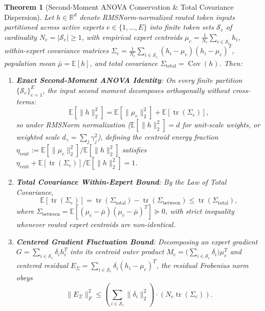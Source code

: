 \documentclass[10pt,twocolumn,letterpaper]{article}
\newtheorem{theorem}{Theorem}
\begin{document}
\begin{theorem}[Second-Moment ANOVA Conservation \& Total Covariance Dispersion]
\label{thm:anova_concentration}
Let $h \in \mathbb{R}^d$ denote RMSNorm-normalized routed token inputs partitioned across active experts $e \in \{1,\dots,E\}$ into finite token sets $\mathcal{S}_e$ of cardinality $N_e = |\mathcal{S}_e| \ge 1$, with empirical expert centroids $\mu_e = \frac{1}{N_e} \sum_{i \in \mathcal{S}_e} h_i$, within-expert covariance matrices $\Sigma_e = \frac{1}{N_e} \sum_{i \in \mathcal{S}_e} (h_i - \mu_e)(h_i - \mu_e)^T$, population mean $\bar{\mu} = \mathbb{E}[h]$, and total covariance $\Sigma_{\text{total}} = \operatorname{Cov}(h)$. Then:
\begin{enumerate}
    \item \textbf{Exact Second-Moment ANOVA Identity}: On every finite partition $\{\mathcal{S}_e\}_{e=1}^E$, the input second moment decomposes orthogonally without cross-terms:
    \begin{equation}
        \mathbb{E}\!\left[\|h\|_2^2\right] = \mathbb{E}\!\left[\|\mu_e\|_2^2\right] + \mathbb{E}\!\left[\operatorname{tr}(\Sigma_e)\right],
    \end{equation}
    so under RMSNorm normalization ($\mathbb{E}[\|h\|_2^2] = d$ for unit-scale weights, or weighted scale $d_\gamma = \sum_j \gamma_j^2$), defining the centroid energy fraction $\eta_{\text{cent}} := \mathbb{E}[\|\mu_e\|_2^2] / \mathbb{E}[\|h\|_2^2]$ satisfies $\eta_{\text{cent}} + \mathbb{E}[\operatorname{tr}(\Sigma_e)] / \mathbb{E}[\|h\|_2^2] = 1$.
    \item \textbf{Total Covariance Within-Expert Bound}: By the Law of Total Covariance,
    \begin{equation}
        \mathbb{E}\!\left[\operatorname{tr}(\Sigma_e)\right] = \operatorname{tr}(\Sigma_{\text{total}}) - \operatorname{tr}(\Sigma_{\text{between}}) \le \operatorname{tr}(\Sigma_{\text{total}}),
    \end{equation}
    where $\Sigma_{\text{between}} = \mathbb{E}[(\mu_e - \bar{\mu})(\mu_e - \bar{\mu})^T] \succeq 0$, with strict inequality whenever routed expert centroids are non-identical.
    \item \textbf{Centered Gradient Fluctuation Bound}: Decomposing an expert gradient $G = \sum_{i \in \mathcal{S}_e} \delta_i h_i^T$ into its centroid outer product $M_c = \big(\sum_{i \in \mathcal{S}_e} \delta_i\big) \mu_e^T$ and centered residual $E_\Sigma = \sum_{i \in \mathcal{S}_e} \delta_i (h_i - \mu_e)^T$, the residual Frobenius norm obeys
    \begin{equation}
        \|E_\Sigma\|_F^2 \le \left(\sum_{i \in \mathcal{S}_e} \|\delta_i\|_2^2\right) \cdot \left(N_e \operatorname{tr}(\Sigma_e)\right).
    \end{equation}
\end{enumerate}
\end{theorem}
\end{document}
